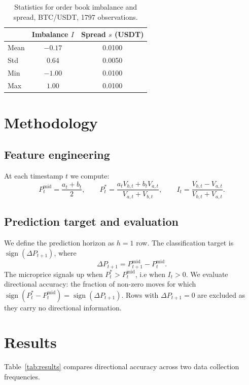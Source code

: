 \documentclass[11pt, a4paper]{article}
\begin{document}
\begin{table}[H]
\centering
\begin{tabular}{lcc}
\toprule
 & Imbalance $I$ & Spread $s$ (USDT) \\
\midrule
Mean   & $-0.17$ & 0.0100 \\
Std    & 0.64    & 0.0050 \\
Min    & $-1.00$ & 0.0100 \\
Max    & $1.00$  & 0.0100 \\
\bottomrule
\end{tabular}
\caption{Statistics for order book imbalance and spread,
BTC/USDT, 1797 observations.}
\label{tab:summary}
\end{table}

\section{Methodology}

\subsection{Feature engineering}

At each timestamp $t$ we compute:
\[
P^{\text{mid}}_t = \frac{a_t + b_t}{2}, \qquad
P^*_t = \frac{a_t V_{b,t} + b_t V_{a,t}}{V_{a,t} + V_{b,t}}, \qquad
I_t = \frac{V_{b,t} - V_{a,t}}{V_{b,t} + V_{a,t}}.
\]

\subsection{Prediction target and evaluation}

We define the prediction horizon as $h = 1$ row. The classification target is $\operatorname{sign}(\Delta P_{t+1})$, where
\[
\Delta P_{t+1} = P^{\text{mid}}_{t+1} - P^{\text{mid}}_t.
\]
The microprice signals up when $P^*_t > P^{\text{mid}}_t$, i.e when $I_t > 0$. We evaluate directional accuracy: the fraction of non-zero moves for which $\operatorname{sign}(P^*_t - P^{\text{mid}}_t) = \operatorname{sign}(\Delta P_{t+1})$. Rows with $\Delta P_{t+1} = 0$ are excluded as they carry no directional information.

\section{Results}

Table~\ref{tab:results} compares directional accuracy across two data
collection frequencies.
\end{document}
